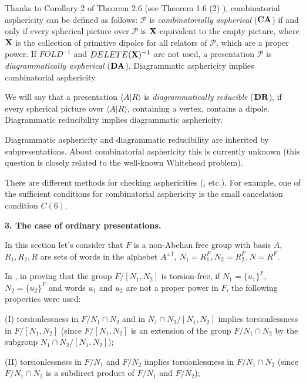 \documentclass[12pt,reqno]{amsart}
\begin{document}
 Thanks to Corollary 2 of Theorem 2.6 \cite{pride} (see Theorem 1.6 (2) \cite{gener_b_pr}), combinatorial asphericity can be defined as follows:
 $\mathcal{P}$ is {\it combinatorially aspherical} ($\bf CA$) if and only if every spherical picture over $\mathcal{P}$ is $\bf X$-equivalent to the empty picture, where $\bf X$ is the collection of primitive dipoles for all relators of $\mathcal{P}$, which are a proper power.
  If $FOLD^{-1}$ and $DELETE({\bf X})^{-1}$ are not used, a presentation $\mathcal{P}$ is {\it diagrammatically aspherical} ($\bf DA$). Diagrammatic asphericity implies combinatorial asphericity.



We will say that a presentation $\langle A|R\rangle$ is {\it diagrammatically reducible} ($\bf DR$), if every spherical picture over  $\langle A|R\rangle$, containing a vertex, contains a dipole.
Diagrammatic reducibility implies diagrammatic asphericity.

Diagrammatic asphericity and diagrammatic reducibility are inherited by subpresentations.
 About combinatorial asphericity this is currently unknown (this question is closely related to the well-known Whitehead problem).


There are different methods for checking asphericities
(\cite{lind, lind2, gersten, sieradski}, etc.). For example, one of the sufficient conditions for combinatorial asphericity is the small cancelation condition $C (6)$.

\vspace{3mm}

{\bf 3. The case of ordinary presentations.}

 In this section let's consider that  $F$ is a non-Abelian free group with basis $A$, $R_1, R_2, R$ are sets of words in the alphebet $A^{\pm 1}$, $N_1=R_1^F, N_2=R_2^F, N=R^F$.

   In \cite{kuzmin2}, in proving that the group $F/[N_1,N_2]$ is torsion-free, if $N_1=\{u_1\}^F$, $N_2=\{u_2\}^F$ and words $u_1$ and $u_2$ are not a proper power in $F$, the following properties were used:



 (I) torsionlessness in $F/N_1\cap N_2$ and in $N_1\cap N_2/[N_1,N_2]$ implies torsionlessness in $F/[N_1,N_2]$ (since $F/[N_1,N_2]$ is an extension of the group $F/N_1\cap N_2$ by the subgroup $N_1\cap N_2/[N_1,N_2]$);

 (II) torsionlessness in $F/N_1$ and $F/N_2$ implies torsionlessness in $F/N_1\cap N_2$ (since $F/N_1\cap N_2$ is a subdirect product of $F/N_1$ and $F/N_2$);
\end{document}
